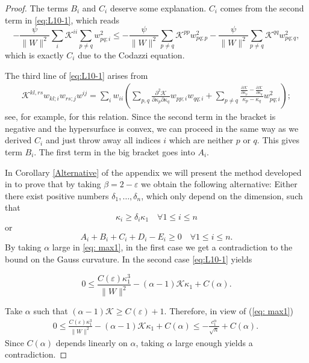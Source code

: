 \documentclass{amsart}
\theoremstyle{definition}
\theoremstyle{remark}
\newtheorem{remark}[theorem]{Remark}
\numberwithin{equation}{section}
\begin{document}
\begin{proof}
The terms $B_i$ and $C_i$ deserve some explanation. $C_i$ comes from the second term in \eqref{eq:L10-1}, which reads
\[-\frac{\psi}{\|W\|^2}\sum_i\mathcal{K}^{ii}\sum_{p\neq q}w_{pq;i}^2\leq -\frac{\psi}{\|W\|^2}\sum_{p\neq q}\mathcal{K}^{pp}w_{pq;p}^2-\frac{\psi}{\|W\|^2}\sum_{p\neq q}\mathcal{K}^{qq}w_{pq;q}^2, \]
which is exactly $C_i$ due to the Codazzi equation.

The third line of \eqref{eq:L10-1} arises from
\begin{align*}
\mathcal{K}^{kl,rs}w_{kl;i}w_{rs;j}w^{ij}=\sum_i w_{ii}\left(\sum_{p,q}\frac{\partial^2\mathcal{K}}{\partial \kappa_p\partial\kappa_q}w_{pp;i}w_{qq;i}+\sum_{p\neq q}\frac{\frac{\partial\mathcal{K}}{\partial \kappa_p}-\frac{\partial\mathcal{K}}{\partial\kappa_q}}{\kappa_p-\kappa_q} w_{pq;i}^2\right);
\end{align*}
see, for example, \cite[Lemma~2.1.14]{Gerhardt:/2006} for this relation. Since the second term in the bracket is negative and the hypersurface is convex, we can proceed in the same way as we derived $C_i$ and just throw away all indices $i$ which are neither $p$ or $q$. This gives term $B_i$. The first term in the big bracket goes into $A_i$.


In Corollary \ref{Alternative} of the appendix we will present the method developed in \cite{Guan} to prove that by taking $\beta=2-\varepsilon$ we obtain the following alternative: Either there exist positive numbers $\delta_1,\dots,\delta_n$, which only depend on the dimension, such that
\[\kappa_i\geq \delta_i\kappa_1\quad\forall 1\leq i\leq n\]
or 
\[A_i+B_i+C_i+D_i-E_i\geq 0\quad\forall 1\leq i\leq n.\]
By taking $\alpha$ large in \eqref{eq: max1}, in the first case we get a contradiction to the bound on the Gauss curvature. In the second case \eqref{eq:L10-1} yields


\[0\leq \frac{C(\varepsilon)\kappa_1^3}{\|W\|^2}-(\alpha-1) \mathcal{K}\kappa_1
+C(\alpha).\]

Take $\alpha$ such that $ (\alpha-1) \mathcal{K}\geq C(\varepsilon)+1$. Therefore, in view of (\ref{eq: max1})
\begin{align}\label{x}
0\leq \frac{C(\varepsilon)\kappa_1^3}{\|W\|^2}-(\alpha-1) \mathcal{K}\kappa_1
+C(\alpha)\leq -\frac{c_1^{\alpha}}{\sqrt{n}}+C(\alpha).\
\end{align}
Since $C(\alpha)$ depends linearly on $\alpha$, taking $\alpha$ large enough yields a contradiction.
\end{proof}
\end{document}
